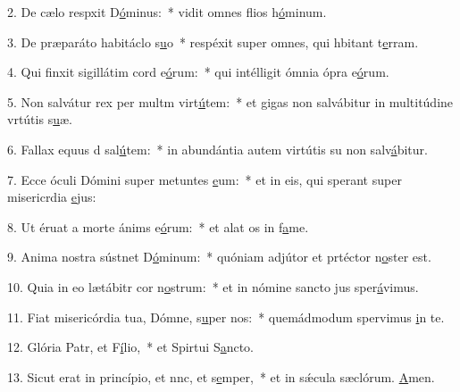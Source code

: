 2. De cælo respxit D\uline{ó}minus:~* vidit omnes flios h\uline{ó}minum.\par 
3. De præparáto habitáclo s\uline{u}o~* respéxit super omnes, qui hbitant t\uline{e}rram.\par 
4. Qui finxit sigillátim cord e\uline{ó}rum:~* qui intélligit ómnia ópra e\uline{ó}rum.\par 
5. Non salvátur rex per multm virt\uline{ú}tem:~* et gigas non salvábitur in multitúdine vrtútis s\uline{u}æ.\par 
6. Fallax equus d sal\uline{ú}tem:~* in abundántia autem virtútis su non salv\uline{á}bitur.\par 
7. Ecce óculi Dómini super metuntes \uline{e}um:~* et in eis, qui sperant super misericrdia \uline{e}jus:\par 
8. Ut éruat a morte ánims e\uline{ó}rum:~* et alat os in f\uline{a}me.\par 
9. Anima nostra sústnet D\uline{ó}minum:~* quóniam adjútor et prtéctor n\uline{o}ster est.\par 
10. Quia in eo lætábitr cor n\uline{o}strum:~* et in nómine sancto jus sper\uline{á}vimus.\par 
11. Fiat misericórdia tua, Dómne, s\uline{u}per nos:~* quemádmodum spervimus \uline{i}n te.\par 
12. Glória Patr, et F\uline{í}lio,~* et Spirtui S\uline{a}ncto.\par 
13. Sicut erat in princípio, et nnc, et s\uline{e}mper,~* et in sǽcula sæclórum. \uline{A}men.\par 
